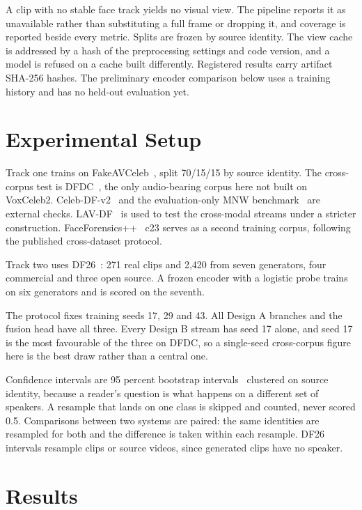 \documentclass[conference]{IEEEtran}
\begin{document}
A clip with no stable face track yields no visual view. The pipeline reports
it as unavailable rather than substituting a full frame or dropping it, and
coverage is reported beside every metric. Splits are frozen by source identity.
The view cache is addressed by a hash of the preprocessing settings and code
version, and a model is refused on a cache built differently. Registered
results carry artifact SHA-256 hashes. The preliminary encoder comparison
below uses a training history and has no held-out evaluation yet.

\section{Experimental Setup}

Track one trains on FakeAVCeleb~\cite{fakeavceleb}, split 70/15/15 by source
identity. The cross-corpus test is DFDC~\cite{dfdc}, the only audio-bearing
corpus here not built on VoxCeleb2. Celeb-DF-v2~\cite{celebdf} and the
evaluation-only MNW benchmark~\cite{mnw} are external checks. LAV-DF~\cite{lavdf}
is used to test the cross-modal streams under a stricter construction.
FaceForensics++~\cite{ffpp} c23 serves as a second training corpus, following
the published cross-dataset protocol.

Track two uses DF26~\cite{df26}: 271 real clips and 2,420 from seven
generators, four commercial and three open source. A frozen encoder with a
logistic probe trains on six generators and is scored on the seventh.

The protocol fixes training seeds 17, 29 and 43. All Design A branches and the
fusion head have all three. Every Design B stream has seed 17 alone, and seed
17 is the most favourable of the three on DFDC, so a single-seed cross-corpus
figure here is the best draw rather than a central one.

Confidence intervals are 95 percent bootstrap intervals~\cite{bootstrap}
clustered on source identity, because a reader's question is what happens on a
different set of speakers. A resample that lands on one class is skipped and
counted, never scored 0.5. Comparisons between two systems are paired: the
same identities are resampled for both and the difference is taken within each
resample. DF26 intervals resample clips or source videos, since generated
clips have no speaker.

\section{Results}
\end{document}
